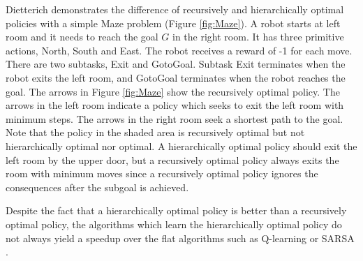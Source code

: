 Dietterich \cite{MaxQJ} demonstrates the difference of recursively and hierarchically optimal policies 
with a simple Maze problem (Figure \ref{fig:Maze}). A robot starts at left room and it needs to reach 
the goal $G$ in the right room. It has three primitive actions, North, South and East.  
The robot receives a reward of -1 for each move.
There are two subtasks, Exit and GotoGoal. Subtask Exit terminates when the robot exits the left room,
and GotoGoal terminates when the robot reaches the goal. The arrows in Figure \ref{fig:Maze} show the 
recursively optimal policy. The arrows in the left room indicate a policy which seeks to exit
the left room with minimum steps. The arrows in the right room seek a shortest path to the goal.
Note that the policy in the shaded area is recursively optimal but not hierarchically optimal nor
optimal. A hierarchically optimal policy should exit the left room by the upper door, but a recursively 
optimal policy always exits the room with minimum moves since
a recursively optimal policy ignores the consequences after the subgoal is achieved. 

Despite the fact that a hierarchically optimal policy is better than a recursively optimal policy, 
the algorithms which learn the hierarchically optimal policy do not always yield a speedup over
the flat algorithms such as Q-learning or SARSA \cite{MaxQJ, Andre02}. 






